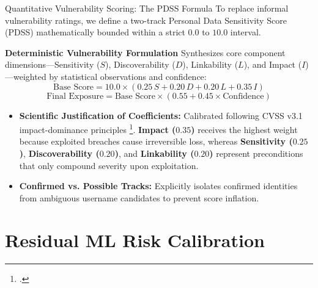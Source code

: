 \documentclass[aspectratio=169,10pt]{beamer}
\begin{document}
\begin{frame}{Quantitative Vulnerability Scoring: The PDSS Formula}
  \small
  To replace informal vulnerability ratings, we define a two-track Personal Data Sensitivity Score (PDSS) mathematically bounded within a strict $0.0$ to $10.0$ interval.
  
  \vspace{0.15cm}
  \begin{block}{\centering \textbf{Deterministic Vulnerability Formulation}}
    \scriptsize
    Synthesizes core component dimensions—Sensitivity ($S$), Discoverability ($D$), Linkability ($L$), and Impact ($I$)—weighted by statistical observations and confidence:
    $$\text{Base Score} = 10.0 \times \left(0.25\,S + 0.20\,D + 0.20\,L + 0.35\,I\right)$$
    $$\text{Final Exposure} = \text{Base Score} \times \left(0.55 + 0.45 \times \text{Confidence}\right)$$
  \end{block}

  \vspace{0.15cm}
  \begin{itemize}\setlength{\itemsep}{0.15cm}
    \item \textbf{Scientific Justification of Coefficients:} Calibrated following CVSS v3.1 impact-dominance principles \footcite{cvss2019}. \textbf{Impact ($\mathbf{0.35}$)} receives the highest weight because exploited breaches cause irreversible loss, whereas \textbf{Sensitivity ($\mathbf{0.25}$)}, \textbf{Discoverability ($\mathbf{0.20}$)}, and \textbf{Linkability ($\mathbf{0.20}$)} represent preconditions that only compound severity upon exploitation.
    \item \textbf{Confirmed vs. Possible Tracks:} Explicitly isolates confirmed identities from ambiguous username candidates to prevent score inflation.
  \end{itemize}
\end{frame}

\section{Residual ML Risk Calibration}
\end{document}
